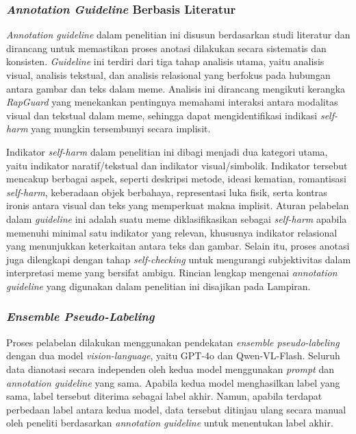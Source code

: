 \subsubsection{\textit{Annotation Guideline} Berbasis Literatur} \label{subsubsec:annotation_guideline_berbasis_literatur}
\textit{Annotation guideline} dalam penelitian ini disusun berdasarkan studi literatur dan dirancang untuk memastikan proses anotasi dilakukan secara sistematis dan konsisten. \textit{Guideline} ini terdiri dari tiga tahap analisis utama, yaitu analisis visual, analisis tekstual, dan analisis relasional yang berfokus pada hubungan antara gambar dan teks dalam meme. Analisis ini dirancang mengikuti kerangka \textit{RapGuard} yang menekankan pentingnya memahami interaksi antara modalitas visual dan tekstual dalam meme, sehingga dapat mengidentifikasi indikasi \textit{self-harm} yang mungkin tersembunyi secara implisit.

Indikator \textit{self-harm} dalam penelitian ini dibagi menjadi dua kategori utama, yaitu indikator naratif/tekstual dan indikator visual/simbolik. Indikator tersebut mencakup berbagai aspek, seperti deskripsi metode, ideasi kematian, romantisasi \textit{self-harm}, keberadaan objek berbahaya, representasi luka fisik, serta kontras ironis antara visual dan teks yang memperkuat makna implisit. Aturan pelabelan dalam \textit{guideline} ini adalah suatu meme diklasifikasikan sebagai \textit{self-harm} apabila memenuhi minimal satu indikator yang relevan, khususnya indikator relasional yang menunjukkan keterkaitan antara teks dan gambar. Selain itu, proses anotasi juga dilengkapi dengan tahap \textit{self-checking} untuk mengurangi subjektivitas dalam interpretasi meme yang bersifat ambigu. Rincian lengkap mengenai \textit{annotation guideline} yang digunakan dalam penelitian ini disajikan pada Lampiran.


\subsubsection{\textit{Ensemble Pseudo-Labeling}} \label{subsubsec:ensemble_pseudo_labeling}
Proses pelabelan dilakukan menggunakan pendekatan \textit{ensemble pseudo-labeling} dengan dua model \textit{vision-language}, yaitu GPT-4o dan Qwen-VL-Flash. 
Seluruh data dianotasi secara independen oleh kedua model menggunakan \textit{prompt} dan \textit{annotation guideline} yang sama. Apabila kedua model menghasilkan label yang sama, label tersebut diterima sebagai label akhir. Namun, apabila terdapat perbedaan label antara kedua model, data tersebut ditinjau ulang secara manual oleh peneliti berdasarkan \textit{annotation guideline} untuk menentukan label akhir.

